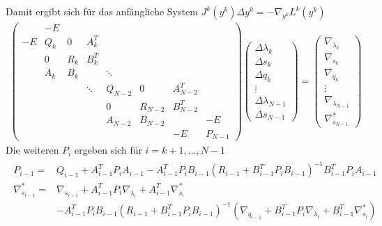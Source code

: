 \documentclass[12pt,a4paper]{article}
\begin{document}
  Damit ergibt sich für das anfängliche System $ J^{k}(y^{k})\Delta y^{k} = -\nabla_{y^{k}} L^{k}(y^{k})$
  \begin{align*}
  \begin{pmatrix}
    & -E &   &   &   &   &   &      \\
  -E& Q_k & 0  &  A_k^{T} &  &   &    &       \\
    & 0   & R_k & B_k^{T} &  &   &   &      \\
    & A_k & B_k &     & \ddots &   &   &    \\
    &  &  & \ddots & Q_{N-2} & 0 & A_{N-2}^{T}  &     \\
    &  &  &        &  0      & R_{N-2}  & B_{N-2}^{T}  &     \\
    &  &  &        & A_{N-2} & B_{N-2}  &     & -E \\
    &  &  &  &  &  & -E & P_{N-1}
  \end{pmatrix}
  \begin{pmatrix}
  \Delta \lambda_{k} \\
  \Delta s_{k} \\
  \Delta q_{k} \\
  \vdots \\
  \Delta \lambda_{N-1} \\
  \Delta s_{N-1} 
  \end{pmatrix} =
  \begin{pmatrix}
  \nabla_{\lambda_{k}} \\
  \nabla_{s_{k}} \\ 
  \nabla_{q_{k}} \\
  \vdots \\
  \nabla_{\lambda_{N-1}} \\
  \nabla_{s_{N-1}}^{*}
  \end{pmatrix}
  \end{align*}
  Die weiteren $P_i $ ergeben sich für $ i = k+1, ..., N-1$
  \begin{align*}
  \begin{array}{rl}
  P_{i-1} = & Q_{i-1}+A_{i-1}^{T}P_i A_{i-1} -A_{i-1}^{T}P_i B_{i-1}
  (R_{i-1}+B_{i-1}^{T}P_i B_{i-1})^{-1} B_{i-1}^{T}P_i A_{i-1} \\
  \nabla_{s_{i-1}}^{*} = & \nabla_{s_{i-1}} + A_{i-1}^{T}P_i \nabla_{\lambda_{i}} + A_{i-1}^{T}\nabla_{s_{i}}^{*} \\
   & - A_{i-1}^{T}P_i B_{i-1}(R_{i-1}+B_{i-1}^{T}P_i B_{i-1})^{-1}(\nabla_{q_{i-1}} +B_{i-1}^{T}P_i \nabla_{\lambda_{i}} +B_{i-1}^{T}\nabla_{s_{i}}^{*})
  \end{array}
  \end{align*}
\end{document}
